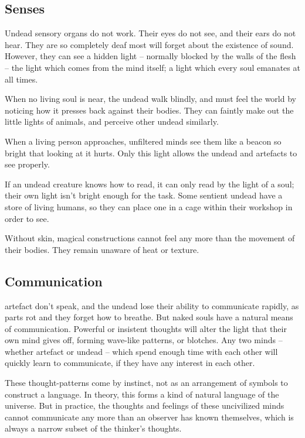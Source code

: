 \begin{multicols}{2}
\renewcommand\npcsymbol{\D}

\subsection[The undead are deaf and blind, but see by the light of living souls]{Senses}
\label{undead_senses}
\label{artefact_senses}

Undead sensory organs do not work.
Their eyes do not see, and their ears do not hear.
They are so completely deaf most will forget about the existence of sound.
However, they can see a hidden light -- normally blocked by the walls of the flesh -- the light which comes from the mind itself; a light which every soul emanates at all times.

When no living soul is near, the undead walk blindly, and must feel the world by noticing how it presses back against their bodies.
They can faintly make out the little lights of animals, and perceive other undead similarly.

When a living person approaches, unfiltered minds see them like a beacon so bright that looking at it hurts.
Only this light allows the undead and \glspl{artefact} to see properly.

If an undead creature knows how to read, it can only read by the light of a soul; their own light isn't bright enough for the task.
Some sentient undead have a store of living humans, so they can place one in a cage within their workshop in order to see.

Without skin, magical constructions cannot feel any more than the movement of their bodies.
They remain unaware of heat or texture.

\subsection{Communication}
\label{dead_communication}

\Gls{artefact} don't speak, and the undead lose their ability to communicate rapidly, as parts rot and they forget how to breathe.
But naked souls have a natural means of communication.
Powerful or insistent thoughts will alter the light that their own mind gives off, forming wave-like patterns, or blotches.
Any two minds -- whether \gls{artefact} or undead -- which spend enough time with each other will quickly learn to communicate, if they have any interest in each other.

These thought-patterns come by instinct, not as an arrangement of symbols to construct a language.
In theory, this forms a kind of natural language of the universe.
But in practice, the thoughts and feelings of these uncivilized minds cannot communicate any more than an observer has known themselves, which is always a narrow subset of the thinker's thoughts.

\end{multicols}

